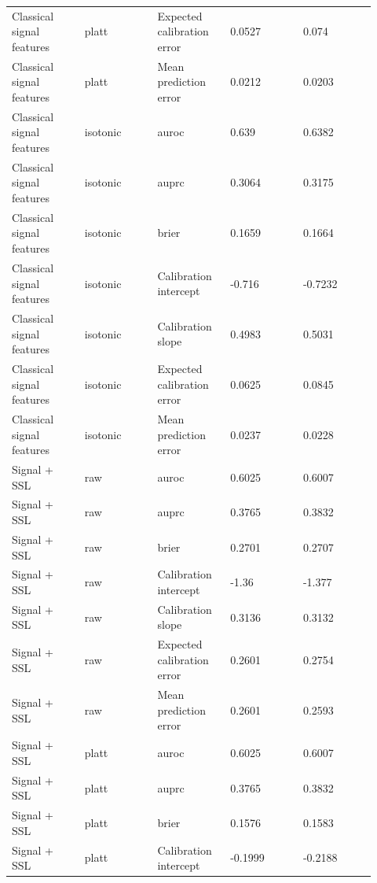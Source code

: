 \documentclass[11pt]{article}
\begin{document}
\begin{landscape}
\begin{longtable}{L{0.184\linewidth} L{0.184\linewidth} L{0.184\linewidth} L{0.184\linewidth} L{0.184\linewidth}}
Classical signal features & platt & Expected calibration error & 0.\allowbreak{}0527 & 0.\allowbreak{}074 \\
Classical signal features & platt & Mean prediction error & 0.\allowbreak{}0212 & 0.\allowbreak{}0203 \\
Classical signal features & isotonic & auroc & 0.\allowbreak{}639 & 0.\allowbreak{}6382 \\
Classical signal features & isotonic & auprc & 0.\allowbreak{}3064 & 0.\allowbreak{}3175 \\
Classical signal features & isotonic & brier & 0.\allowbreak{}1659 & 0.\allowbreak{}1664 \\
Classical signal features & isotonic & Calibration intercept & -\allowbreak{}0.\allowbreak{}716 & -\allowbreak{}0.\allowbreak{}7232 \\
Classical signal features & isotonic & Calibration slope & 0.\allowbreak{}4983 & 0.\allowbreak{}5031 \\
Classical signal features & isotonic & Expected calibration error & 0.\allowbreak{}0625 & 0.\allowbreak{}0845 \\
Classical signal features & isotonic & Mean prediction error & 0.\allowbreak{}0237 & 0.\allowbreak{}0228 \\
Signal + SSL & raw & auroc & 0.\allowbreak{}6025 & 0.\allowbreak{}6007 \\
Signal + SSL & raw & auprc & 0.\allowbreak{}3765 & 0.\allowbreak{}3832 \\
Signal + SSL & raw & brier & 0.\allowbreak{}2701 & 0.\allowbreak{}2707 \\
Signal + SSL & raw & Calibration intercept & -\allowbreak{}1.\allowbreak{}36 & -\allowbreak{}1.\allowbreak{}377 \\
Signal + SSL & raw & Calibration slope & 0.\allowbreak{}3136 & 0.\allowbreak{}3132 \\
Signal + SSL & raw & Expected calibration error & 0.\allowbreak{}2601 & 0.\allowbreak{}2754 \\
Signal + SSL & raw & Mean prediction error & 0.\allowbreak{}2601 & 0.\allowbreak{}2593 \\
Signal + SSL & platt & auroc & 0.\allowbreak{}6025 & 0.\allowbreak{}6007 \\
Signal + SSL & platt & auprc & 0.\allowbreak{}3765 & 0.\allowbreak{}3832 \\
Signal + SSL & platt & brier & 0.\allowbreak{}1576 & 0.\allowbreak{}1583 \\
Signal + SSL & platt & Calibration intercept & -\allowbreak{}0.\allowbreak{}1999 & -\allowbreak{}0.\allowbreak{}2188 \\

\end{longtable}
\end{landscape}
\end{document}
